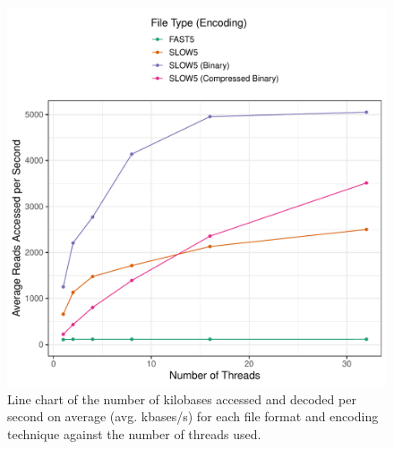 \begin{figure}[h]
    \includegraphics[width=\linewidth]{../../plots/gpgpu_read_time_thread.pdf}
    \caption[Line chart of the number of kilobases accessed and decoded per second on average for each file format and encoding technique against the number of threads used.]{Line chart of the number of kilobases accessed and decoded per second on average (avg. kbases/s) for each file format and encoding technique against the number of threads used.}
    \label{fig:time}
\end{figure}
